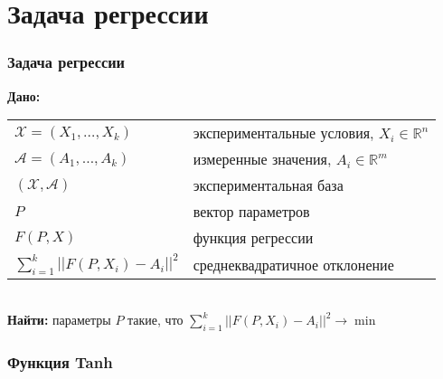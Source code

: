 \documentclass[24pt,pdf,hyperref={unicode},aspectratio=169]{beamer}
\begin{document}
\section{Задача регрессии}

\begin{frame}\frametitle{Задача регрессии}
{\bf Дано:}

\begin{tabular}{p{4cm} p{7cm}}
 $\mathcal{X}=(X_1,\ldots,X_k)$ & экспериментальные условия, $X_i\in\mathbb{R}^n$\\[0.1cm]
 $\mathcal{A}=(A_1,\ldots,A_k)$ & измеренные значения, $A_i\in\mathbb{R}^m$\\[0.1cm]
 $(\mathcal{X},\mathcal{A})$ & экспериментальная база \\[0.1cm]
 $P$ & вектор параметров \\[0.1cm]
 $F(P,X)$ & функция регрессии \\[0.1cm]
 $\sum_{i=1}^{k} ||F(P,X_i)-A_i||^2 $ & среднеквадратичное отклонение\\
 \end{tabular}\\[1cm]
 {\bf Найти:}
 параметры $P$ такие, что $\sum_{i=1}^{k} ||F(P,X_i)-A_i||^2 \rightarrow \min$
\end{frame}

\begin{frame}\frametitle{Функция Tanh}
\end{frame}
\end{document}
